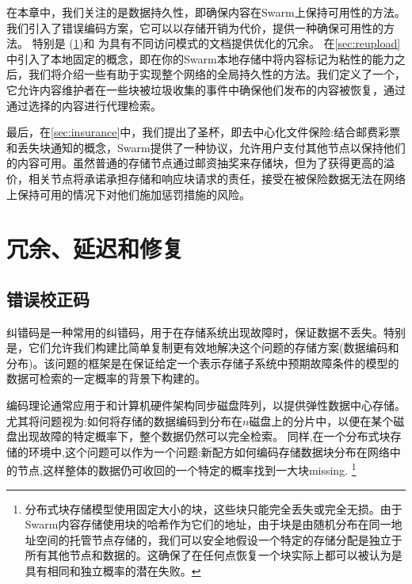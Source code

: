 在本章中，我们关注的是数据持久性，即确保内容在Swarm上保持可用性的方法。
我们引入了错误编码方案，它可以以存储开销为代价，提供一种确保可用性的方法。
特别是 (\ref{sec:repair})和 %
为具有不同访问模式的文档提供优化的冗余。
在\ref{sec:reupload}中引入了本地固定的概念，即在你的Swarm本地存储中将内容标记为粘性的能力之后，我们将介绍一些有助于实现整个网络的全局持久性的方法。我们定义了一个，它允许内容维护者在一些块被垃圾收集的事件中确保他们发布的内容被恢复，通过通过选择的内容进行代理检索。

最后，在\ref{sec:insurance}中，我们提出了圣杯，即去中心化文件保险:结合邮费彩票和丢失块通知的概念，Swarm提供了一种协议，允许用户支付其他节点以保持他们的内容可用。虽然普通的存储节点通过邮资抽奖来存储块，但为了获得更高的溢价，相关节点将承诺承担存储和响应块请求的责任，接受在被保险数据无法在网络上保持可用的情况下对他们施加惩罚措施的风险。


\section{冗余、延迟和修复\statusgreen}\label{sec:repair}

\green{}

\subsection{错误校正码}\label{sec:error-correcting-codes}

纠错码是一种常用的纠错码，用于在存储系统出现故障时，保证数据不丢失。特别是，它们允许我们构建比简单复制更有效地解决这个问题的存储方案(数据编码和分布)。该问题的框架是在保证给定一个表示存储子系统中预期故障条件的模型的数据可检索的一定概率的背景下构建的。

编码理论通常应用于和计算机硬件架构同步磁盘阵列，以提供弹性数据中心存储。
尤其将问题视为:如何将存储的数据编码到分布在$n$磁盘上的分片中，以便在某个磁盘出现故障的特定概率下，整个数据仍然可以完全检索。
同样,在一个分布式块存储的环境中,这个问题可以作为一个问题:新配方如何编码存储数据块分布在网络中的节点,这样整体的数据仍可收回的一个特定的概率找到一大块missing. %
%
\footnote{分布式块存储模型使用固定大小的块，这些块只能完全丢失或完全无损。由于Swarm内容存储使用块的哈希作为它们的地址，由于块是由随机分布在同一地址空间的托管节点存储的，我们可以安全地假设一个特定的存储分配是独立于所有其他节点和数据的。这确保了在任何点恢复一个块实际上都可以被认为是具有相同和独立概率的潜在失败。}

